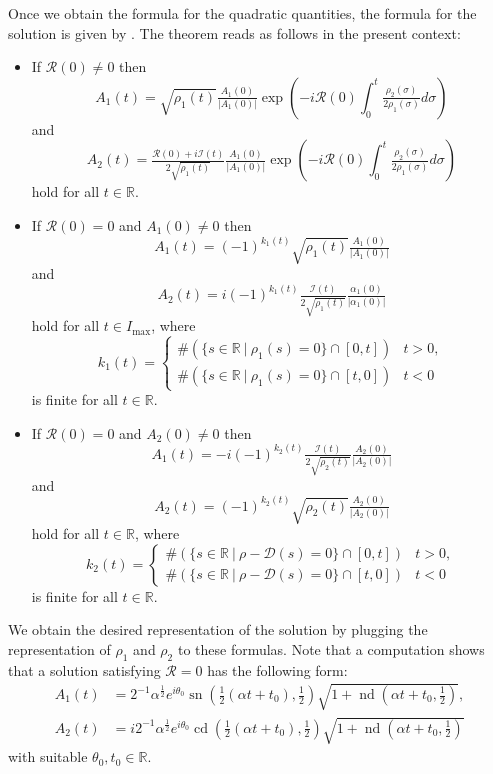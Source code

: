 \documentclass[11pt,a4paper,oneside]{amsart}
\theoremstyle{plain}
\newtheorem{theorem}{Theorem}[section]
\theoremstyle{remark}
\numberwithin{equation}{section}
\newcommand{\C}{\mathbb{C}}
\newcommand{\R}{\mathbb{R}}
\def\({\left(}
\def\){\right)}
\DeclareMathOperator{\sn}{sn}
\DeclareMathOperator{\cd}{cd}
\DeclareMathOperator{\nd}{nd}
\theoremstyle{definition}
\begin{document}
Once we obtain the formula for the quadratic quantities, the formula for the solution is given by \cite[Theorem 4.1]{M3}. The theorem reads as follows in the present context:
\begin{itemize}
\item
If $\mathcal{R}(0) \neq 0$ then
\[
	A_1 (t) = \sqrt{\rho_1(t)} \tfrac{A_1(0)}{|A_1(0)|} \exp\(- i \mathcal{R}(0) \int_0^t \tfrac{\rho_2(\sigma) }{2\rho_1(\sigma)}  d\sigma \)
\]
and
\[
	A_2 (t) = \tfrac{\mathcal{R}(0)+i\mathcal{I}(t)}{2\sqrt{\rho_1(t)}}
	\tfrac{A_1(0)}{|A_1(0)|} \exp\(- i \mathcal{R}(0)\int_0^t \tfrac{\rho_2(\sigma) }{2\rho_1(\sigma)}  d\sigma \)
\]
hold for all $t\in \R$.
\item
If $\mathcal{R}(0)=0$ and
$A_1(0)\neq0$ then
\[
	A_1 (t) = (-1)^{k_1(t)} \sqrt{\rho_1(t)} \tfrac{A_1(0)}{|A_1(0)|} 
\]
and
\[
	A_2 (t) = i(-1)^{k_1(t)} \tfrac{\mathcal{I}(t)}{2\sqrt{\rho_1(t)}}
	\tfrac{\alpha_1(0)}{|\alpha_1(0)|} 
\]
hold for all $t\in I_{\max}$,
where
\[
	k_1 (t) = \begin{cases}
	\# (\{ s \in \R \ |\ \rho_1(s) =0 \} \cap [0,t]) & t>0, \\
	\# (\{ s \in \R \ |\ \rho_1(s) =0 \} \cap [t,0]) & t<0 
	\end{cases}
\]
is finite for all $t\in \R$.
\item
If $\mathcal{R}(0)=0$ and $A_2(0)\neq0$ then
\[
	A_1 (t) =  -i (-1)^{k_2(t)}
	\tfrac{\mathcal{I}(t)}{2\sqrt{\rho_2(t)}}
	\tfrac{A_2(0)}{|A_2(0)|} 
\]
and
\[
	A_2 (t) =   (-1)^{k_2(t)}
	\sqrt{\rho_2(t)}
	\tfrac{A_2(0)}{|A_2(0)|} 
\]
hold for all $t\in \R$,
where
\[
	k_2 (t) = \begin{cases}
	\# (\{ s \in \R \ |\ \rho - \mathcal{D}(s) =0 \} \cap [0,t]) & t>0, \\
	\# (\{ s \in \R \ |\ \rho - \mathcal{D}(s) =0 \} \cap [t,0]) & t<0 
	\end{cases}
\]
is finite for all $t\in \R$.
\end{itemize}


We obtain the desired representation of the solution by plugging the representation of $\rho_1$ and $\rho_2$ to these formulas.
Note that a computation shows that
a solution satisfying $\mathcal{R}=0$ has the following form:
\begin{align*}
	A_1(t)&=2^{-1} \alpha^{\frac12} e^{i\theta_0} \sn (\tfrac12( \alpha t + t_0) ,\tfrac12) \sqrt{1+ \nd ( \alpha t + t_0 ,\tfrac12)}, \\
	A_2(t)&=i 2^{-1} \alpha^{\frac12} e^{i\theta_0} \cd (\tfrac12( \alpha t + t_0),\tfrac12) \sqrt{1+ \nd ( \alpha t + t_0,\tfrac12)}
\end{align*}
with suitable  $\theta_0,t_0 \in \R$.
\end{document}
